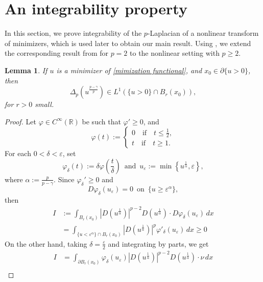 \documentclass[11pt, reqno]{amsart}
\newtheorem{lemma}{Lemma}
\numberwithin{equation}{section}
\numberwithin{theorem}{section}
\numberwithin{lemma}{section}
\numberwithin{corollary}{section}
\numberwithin{remark}{section}
\numberwithin{proposition}{section}
\numberwithin{definition}{section}
\newcommand{\R}{\mathbb{R}}
\begin{document}
\section{An integrability property}\label{s3}
In this section, we prove integrability of the $p$-Laplacian of a nonlinear transform of minimizers, which is used later to obtain our main result. Using , we extend the corresponding result from \cite[Corollary 2.7]{Ph83} for $p=2$ to the nonlinear setting with $p\ge2$.
\begin{lemma}\label{integrability lemma}
    If $u$ is a minimizer of \eqref{mimization functional}, and $x_0\in\partial\{u>0\}$, then
    $$
    \Delta_p(u^{\frac{p-\gamma}{p}})\in L^1\left(\{u>0\}\cap B_r(x_0)\right),
    $$
    for $r>0$ small.
\end{lemma}
\begin{proof}
    Let $\varphi\in C^\infty(\R)$ be such that $\varphi'\ge0$, and
    \begin{equation*}
    \varphi(t):=
    \begin{cases}
    0 \quad \textrm{if} \quad t\le\frac{1}{2},\\
    t \quad \textrm{if} \quad t\ge 1.
    \end{cases}
    \end{equation*}
    For each $0<\delta<\varepsilon$, set
    \begin{equation*}
    \varphi_\delta(t):=\delta\varphi\left(\frac{t}{\delta}\right)\,\,\,\text{and}\,\,\,u_\varepsilon:=\min\left\{ u^\frac{1}{\alpha},\varepsilon\right\},
    \end{equation*}
    where $\alpha:=\frac{p}{p-\gamma}$. Since $\varphi_\delta'\ge0$ and
    \begin{equation*}
        D\varphi_\delta(u_\varepsilon)=0\,\,\,\text{on}\,\,\,\{u\ge\varepsilon^\alpha\},
    \end{equation*}
    then
    \begin{align}\label{I is positive}
        I&:=\int_{B_r(x_0)}|D(u^{\frac{1}{\alpha}})|^{p-2}D(u^{\frac{1}{\alpha}})\cdot D\varphi_\delta(u_\varepsilon)\,dx\nonumber\\
        &=\int_{\{u<\varepsilon^\alpha\}\cap B_r(x_0)}|D(u^{\frac{1}{\alpha}})|^p\varphi'_\delta(u_\varepsilon)\,dx\ge0
    \end{align} 
    On the other hand, taking $\delta=\frac{\varepsilon}{2}$ and integrating by parts, we get
    \begin{align}\label{integration by parts}
        I&=\int_{\partial B_r(x_0)}\varphi_\delta(u_\varepsilon)|D(u^{\frac{1}{\alpha}})|^{p-2}D(u^{\frac{1}{\alpha}})\cdot\nu\,dx\nonumber\\

\end{align}
\end{proof}
\end{document}
